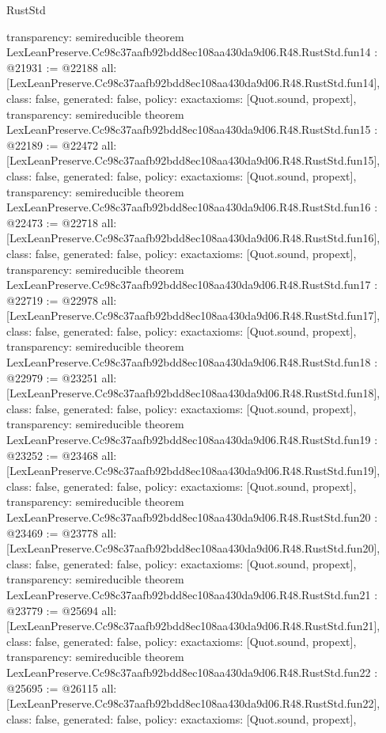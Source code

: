 \begin{lexlean}{RustStd}
\begin{coremodule}
{  transparency: semireducible
}
theorem LexLeanPreserve.Cc98c37aafb92bdd8ec108aa430da9d06.R48.RustStd.fun14 : @21931 := @22188 {
  all: [LexLeanPreserve.Cc98c37aafb92bdd8ec108aa430da9d06.R48.RustStd.fun14],
  class: false,
  generated: false,
  policy: exact{axioms: [Quot.sound, propext]},
  transparency: semireducible
}
theorem LexLeanPreserve.Cc98c37aafb92bdd8ec108aa430da9d06.R48.RustStd.fun15 : @22189 := @22472 {
  all: [LexLeanPreserve.Cc98c37aafb92bdd8ec108aa430da9d06.R48.RustStd.fun15],
  class: false,
  generated: false,
  policy: exact{axioms: [Quot.sound, propext]},
  transparency: semireducible
}
theorem LexLeanPreserve.Cc98c37aafb92bdd8ec108aa430da9d06.R48.RustStd.fun16 : @22473 := @22718 {
  all: [LexLeanPreserve.Cc98c37aafb92bdd8ec108aa430da9d06.R48.RustStd.fun16],
  class: false,
  generated: false,
  policy: exact{axioms: [Quot.sound, propext]},
  transparency: semireducible
}
theorem LexLeanPreserve.Cc98c37aafb92bdd8ec108aa430da9d06.R48.RustStd.fun17 : @22719 := @22978 {
  all: [LexLeanPreserve.Cc98c37aafb92bdd8ec108aa430da9d06.R48.RustStd.fun17],
  class: false,
  generated: false,
  policy: exact{axioms: [Quot.sound, propext]},
  transparency: semireducible
}
theorem LexLeanPreserve.Cc98c37aafb92bdd8ec108aa430da9d06.R48.RustStd.fun18 : @22979 := @23251 {
  all: [LexLeanPreserve.Cc98c37aafb92bdd8ec108aa430da9d06.R48.RustStd.fun18],
  class: false,
  generated: false,
  policy: exact{axioms: [Quot.sound, propext]},
  transparency: semireducible
}
theorem LexLeanPreserve.Cc98c37aafb92bdd8ec108aa430da9d06.R48.RustStd.fun19 : @23252 := @23468 {
  all: [LexLeanPreserve.Cc98c37aafb92bdd8ec108aa430da9d06.R48.RustStd.fun19],
  class: false,
  generated: false,
  policy: exact{axioms: [Quot.sound, propext]},
  transparency: semireducible
}
theorem LexLeanPreserve.Cc98c37aafb92bdd8ec108aa430da9d06.R48.RustStd.fun20 : @23469 := @23778 {
  all: [LexLeanPreserve.Cc98c37aafb92bdd8ec108aa430da9d06.R48.RustStd.fun20],
  class: false,
  generated: false,
  policy: exact{axioms: [Quot.sound, propext]},
  transparency: semireducible
}
theorem LexLeanPreserve.Cc98c37aafb92bdd8ec108aa430da9d06.R48.RustStd.fun21 : @23779 := @25694 {
  all: [LexLeanPreserve.Cc98c37aafb92bdd8ec108aa430da9d06.R48.RustStd.fun21],
  class: false,
  generated: false,
  policy: exact{axioms: [Quot.sound, propext]},
  transparency: semireducible
}
theorem LexLeanPreserve.Cc98c37aafb92bdd8ec108aa430da9d06.R48.RustStd.fun22 : @25695 := @26115 {
  all: [LexLeanPreserve.Cc98c37aafb92bdd8ec108aa430da9d06.R48.RustStd.fun22],
  class: false,
  generated: false,
  policy: exact{axioms: [Quot.sound, propext]},
}
\end{coremodule}
\end{lexlean}
